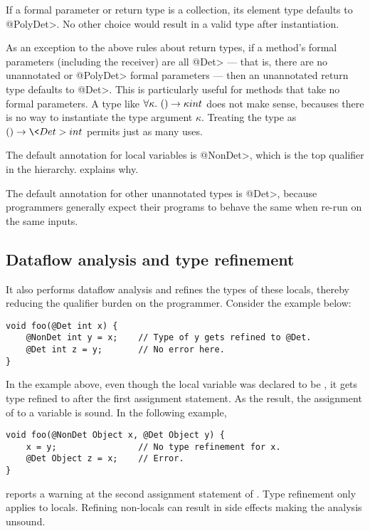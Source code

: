 If a formal parameter or return type is a collection, its element type
defaults to \<@PolyDet>.  No other choice would result in a valid type
after instantiation.

As an exception to the above rules about return types, if a method's formal
parameters (including the receiver) are all \<@Det> --- that is, there are
no unannotated or \<@PolyDet> formal parameters --- then an unannotated
return type defaults to \<@Det>.  This is particularly useful for methods
that take no formal parameters.  A type like $\forall \kappa . \  ()
\rightarrow \kappa int$ does not make sense, becauses there is no way to
instantiate the type argument $\kappa$.  Treating the type as $()
\rightarrow \<Det> int$ permits just as many uses.

The default annotation for local variables is \<@NonDet>, which is the top
qualifier in the hierarchy.   explains why.

The default annotation for other unannotated types is \<@Det>, because
programmers generally expect their programs to behave the same when re-run
on the same inputs.



\subsection{Dataflow analysis and type refinement}\label{sec:dataflow-java}


It also performs dataflow analysis and refines the types of these locals, thereby reducing the qualifier burden 
on the programmer. Consider the example below:
\begin{verbatim}
void foo(@Det int x) {
    @NonDet int y = x;    // Type of y gets refined to @Det.
    @Det int z = y;       // No error here.
}
\end{verbatim}
In the example above, even though the local variable  was declared to be , it gets
type refined to  after the first assignment statement. As the result, the assignment of 
to a  variable  is sound. In the following example,
\begin{verbatim}
void foo(@NonDet Object x, @Det Object y) {
    x = y;                // No type refinement for x.
    @Det Object z = x;    // Error.
}
\end{verbatim}
\theDeterminismChecker reports a warning at the second assignment statement of . Type refinement only applies to locals. Refining non-locals can result in side effects making the analysis unsound.

